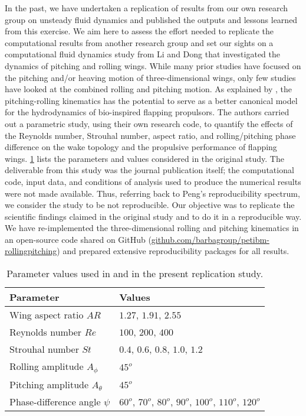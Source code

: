 In the past, we have undertaken a replication of results from our own research group on unsteady fluid dynamics\supercite{krishnan_et_al_2014} and published the outputs and lessons learned from this exercise.\supercite{mesnard_barba_2017}
We aim here to assess the effort needed to replicate the computational results from another research group and set our sights on a computational fluid dynamics study from Li and Dong\supercite{li_dong_2016} that investigated the dynamics of pitching and rolling wings.
While many prior studies have focused on the pitching and/or heaving motion of three-dimensional wings, only few studies have looked at the combined rolling and pitching motion.
As explained by \citet{li_dong_2016}, the pitching-rolling kinematics has the potential to serve as a better canonical model for the hydrodynamics of bio-inspired flapping propulsors.
The authors carried out a parametric study, using their own research code, to quantify the effects of the Reynolds number, Strouhal number, aspect ratio, and rolling/pitching phase difference on the wake topology and the propulsive performance of flapping wings.
\cref{tab:parameters} lists the parameters and values considered in the original study.
The deliverable from this study was the journal publication itself; the computational code, input data, and conditions of analysis used to produce the numerical results were not made available.
Thus, referring back to Peng's reproducibility spectrum, we consider the study to be not reproducible.
Our objective was to replicate the scientific findings claimed in the original study and to do it in a reproducible way.
We have re-implemented the three-dimensional rolling and pitching kinematics in an open-source code shared on GitHub (\url{github.com/barbagroup/petibm-rollingpitching}) and prepared extensive reproducibility packages for all results.

\begin{table}%
  \centering
  \begin{tabular}{ll}
    \hline\hline
    Parameter & Values \\
    \hline
    Wing aspect ratio $AR$ & $1.27$, $1.91$, $2.55$ \\
    Reynolds number $Re$ & $100$, $200$, $400$ \\
    Strouhal number $St$ & $0.4$, $0.6$, $0.8$, $1.0$, $1.2$ \\
    Rolling amplitude $A_\phi$ & $45^o$ \\
    Pitching amplitude $A_\theta$ & $45^o$ \\
    Phase-difference angle $\psi$ & $60^o$, $70^o$, $80^o$, $90^o$, $100^o$, $110^o$, $120^o$ \\
    \hline\hline
  \end{tabular}
  \caption{Parameter values used in \citet{li_dong_2016} and in the present replication study.}
  \label{tab:parameters}
\end{table}

